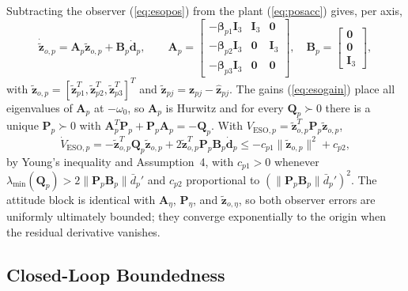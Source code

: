 \documentclass[Review,sageh,times]{sagej}
\begin{document}
Subtracting the observer (\ref{eq:esopos}) from the plant (\ref{eq:posacc}) gives, per axis,
\begin{equation}
\dot{\tilde{\mathbf{z}}}_{o,p} = \mathbf{A}_p\tilde{\mathbf{z}}_{o,p}
+ \mathbf{B}_p\dot{\mathbf{d}}_p,
\qquad
\mathbf{A}_p =
\begin{bmatrix}
-\boldsymbol{\beta}_{p1}\mathbf{I}_3 & \mathbf{I}_3 & \mathbf{0}\\
-\boldsymbol{\beta}_{p2}\mathbf{I}_3 & \mathbf{0} & \mathbf{I}_3\\
-\boldsymbol{\beta}_{p3}\mathbf{I}_3 & \mathbf{0} & \mathbf{0}
\end{bmatrix},
\quad
\mathbf{B}_p =
\begin{bmatrix}
\mathbf{0}\\\mathbf{0}\\\mathbf{I}_3
\end{bmatrix},
\label{eq:esodyn}
\end{equation}
with
$\tilde{\mathbf{z}}_{o,p}=[\tilde{\mathbf{z}}_{p1}^{T},\tilde{\mathbf{z}}_{p2}^{T},\tilde{\mathbf{z}}_{p3}^{T}]^{T}$
and $\tilde{\mathbf{z}}_{pj}=\mathbf{z}_{pj}-\hat{\mathbf{z}}_{pj}$. The gains (\ref{eq:esogain})
place all eigenvalues of $\mathbf{A}_p$ at $-\omega_0$, so $\mathbf{A}_p$ is Hurwitz and for
every $\mathbf{Q}_p\succ0$ there is a unique $\mathbf{P}_p\succ0$ with
$\mathbf{A}_p^{T}\mathbf{P}_p+\mathbf{P}_p\mathbf{A}_p=-\mathbf{Q}_p$. With
$V_{\mathrm{ESO},p}=\tilde{\mathbf{z}}_{o,p}^{T}\mathbf{P}_p\tilde{\mathbf{z}}_{o,p}$,
\begin{equation}
\dot V_{\mathrm{ESO},p} = -\tilde{\mathbf{z}}_{o,p}^{T}\mathbf{Q}_p\tilde{\mathbf{z}}_{o,p}
+ 2\tilde{\mathbf{z}}_{o,p}^{T}\mathbf{P}_p\mathbf{B}_p\dot{\mathbf{d}}_p
\le -c_{p1}\|\tilde{\mathbf{z}}_{o,p}\|^2 + c_{p2},
\label{eq:Vesop}
\end{equation}
by Young's inequality and Assumption~4, with $c_{p1}>0$ whenever
$\lambda_{\min}(\mathbf{Q}_p)>2\|\mathbf{P}_p\mathbf{B}_p\|\bar d_p'$ and $c_{p2}$ proportional to
$(\|\mathbf{P}_p\mathbf{B}_p\|\bar d_p')^2$. The attitude block is identical with
$\mathbf{A}_\eta$, $\mathbf{P}_\eta$, and $\tilde{\mathbf{z}}_{o,\eta}$, so both observer errors are
uniformly ultimately bounded; they converge exponentially to the origin when
the residual derivative vanishes.

\subsection*{Closed-Loop Boundedness}
\end{document}
